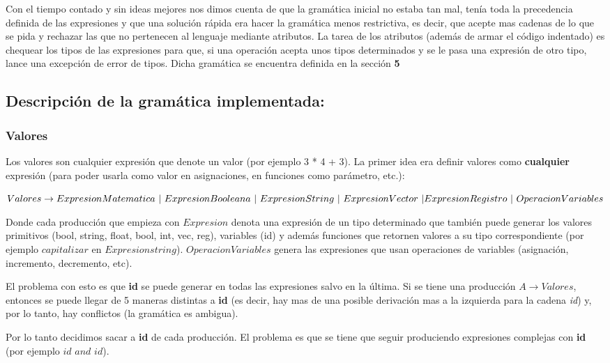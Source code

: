Con el tiempo contado y sin ideas mejores nos dimos cuenta de que la gramática inicial no estaba tan mal, tenía toda la precedencia definida de las expresiones y que una solución rápida era hacer la gramática menos restrictiva, es decir, que acepte mas cadenas de lo que se pida y rechazar las que no pertenecen al lenguaje mediante atributos. La tarea de los atributos (además de armar el código indentado) es chequear los tipos de las expresiones para que, si una operación acepta unos tipos determinados y se le pasa una expresión de otro tipo, lance una excepción de error de tipos. Dicha gramática se encuentra definida en la sección \textbf{5}

\subsection{Descripción de la gramática implementada:}

\subsubsection{Valores}
Los valores son cualquier expresión que denote un valor (por ejemplo 3 * 4 + 3). La primer idea era definir valores como \textbf{cualquier} expresión (para poder usarla como valor en asignaciones, en funciones como parámetro, etc.):

$Valores \rightarrow ExpresionMatematica \  | \  ExpresionBooleana \  | \ ExpresionString  \ | \ ExpresionVector \ | \ \\ ExpresionRegistro \ | \ OperacionVariables $

Donde cada producción que empieza con $Expresion$ denota una expresión de un tipo determinado que también puede generar los valores primitivos (bool, string, float, bool, int, vec, reg), variables (id) y además funciones que retornen valores a su tipo correspondiente (por ejemplo $capitalizar$ en $Expresionstring$). $OperacionVariables$ genera las expresiones que usan operaciones de variables (asignación, incremento, decremento, etc). 

El problema con esto es que \textbf{id} se puede generar en todas las expresiones salvo en la última. Si se tiene una producción $A \rightarrow Valores$, entonces se puede llegar de 5 maneras distintas a \textbf{id} (es decir, hay mas de una posible derivación mas a la izquierda para la cadena \textit{id}) y, por lo tanto, hay conflictos (la gramática es ambigua). 

Por lo tanto decidimos sacar a \textbf{id} de cada producción. El problema es que se tiene que seguir produciendo expresiones complejas con \textbf{id} (por ejemplo $id$ $and$ $id$).

